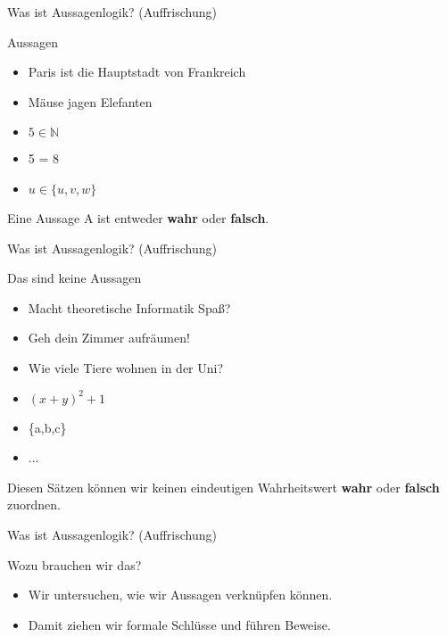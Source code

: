 \begin{frame}[fragile]{Was ist Aussagenlogik? (Auffrischung)}
    \begin{alertblock}{Aussagen}
    \begin{itemize}
        \item Paris ist die Hauptstadt von Frankreich
        \item Mäuse jagen Elefanten
        \item $5 \in \mathbb{N}$
        \item 5 = 8
        \item $u \in \{u, v, w\}$
    \end{itemize}
    \end{alertblock}
    Eine Aussage A ist entweder \textbf{wahr} oder \textbf{falsch}.
\end{frame}

\begin{frame}[fragile]{Was ist Aussagenlogik? (Auffrischung)}
    \begin{alertblock}{Das sind keine Aussagen}
    \begin{itemize}
        \item Macht theoretische Informatik Spaß?
        \item Geh dein Zimmer aufräumen!
        \item Wie viele Tiere wohnen in der Uni?
        \item $(x+y)^2+1$
        \item \{a,b,c\}
        \item ...
    \end{itemize}
    \end{alertblock}
    Diesen Sätzen können wir keinen eindeutigen Wahrheitswert \textbf{wahr} oder \textbf{falsch} zuordnen.
\end{frame}

\begin{frame}[fragile]{Was ist Aussagenlogik? (Auffrischung)}
    \begin{alertblock}{Wozu brauchen wir das?}
    \begin{itemize}
        \item Wir untersuchen, wie wir Aussagen verknüpfen können.
        \item Damit ziehen wir formale Schlüsse und führen Beweise.
    \end{itemize}
    \end{alertblock}
\end{frame}

